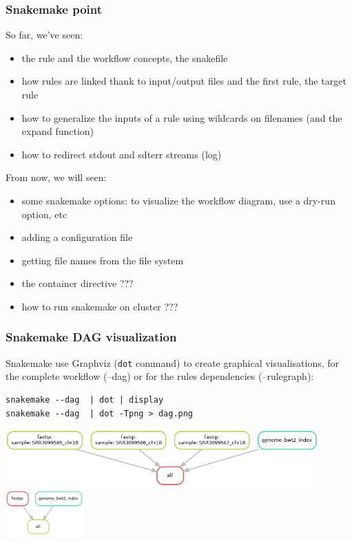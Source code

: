 \begin{frame}[containsverbatim]
\frametitle{Snakemake point}
\begin{block}{So far, we've seen:}
\begin{itemize}
    \item the rule and the workflow concepts, the snakefile
    \item how rules are linked thank to input/output files and the first rule, the target rule
    \item how to generalize the inputs of a rule using wildcards on filenames (and the expand function)
    \item how to redirect stdout and sdterr streams (log)
\end{itemize}
\end{block}
\begin{block}{From now, we will seen:}
\begin{itemize}
    \item some snakemake options: to visualize the workflow diagram, use a dry-run option, etc
    \item adding a configuration file
    \item getting file names from the file system
    \item \alert{the container directive ???}
    \item \alert{how to run snakemake on cluster ???}
\end{itemize}
\end{block}
\end{frame}
\begin{frame}[containsverbatim]
\frametitle{Snakemake DAG visualization}
\begin{block}{}
Snakemake use Graphviz (\verb|dot| command) to create graphical visualisations, for the complete workflow (--dag) or for the rules dependencies (--rulegraph):
\begin{lstlisting}
snakemake --dag  | dot | display
snakemake --dag  | dot -Tpng > dag.png
\end{lstlisting}
\end{block}
\begin{center}
    \includegraphics[width=12cm]{03_workflow/images/FAIR_ex1_o7_dag.png}\\
    \includegraphics[width=3cm]{03_workflow/images/FAIR_ex1_o5_ruleG.png}
\end{center}
\end{frame}
